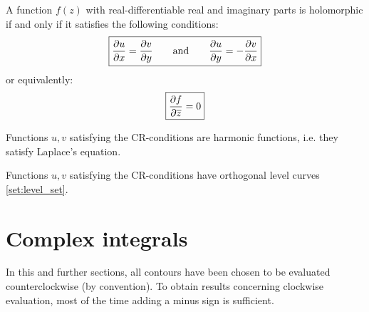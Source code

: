         \begin{theorem}
            A function $f(z)$ with real-differentiable real and imaginary parts is holomorphic if and only if it satisfies the following conditions:
            \begin{equation}
                \label{complexcalculus:cauchy_riemann}
                \boxed{\frac{\partial u}{\partial x} = \frac{\partial v}{\partial y} \text{\qquad and\qquad} \frac{\partial u}{\partial y} = -\frac{\partial v}{\partial x}}
            \end{equation}
            or equivalently:
            \begin{equation}
                \label{complexcalculus:holomorphic_alternative_condition}
                \boxed{\frac{\partial f}{\partial \overline{z}} = 0}
            \end{equation}
        \end{theorem}

	\begin{property}
		Functions $u,v$ satisfying the CR-conditions are harmonic functions, i.e. they satisfy Laplace's equation.
	\end{property}
    \begin{property}
		Functions $u,v$ satisfying the CR-conditions have orthogonal level curves \ref{set:level_set}.
	\end{property}

\section{Complex integrals}
		In this and further sections, all contours have been chosen to be evaluated counterclockwise (by convention). To obtain results concerning clockwise evaluation, most of the time adding a minus sign is sufficient.
        
        
